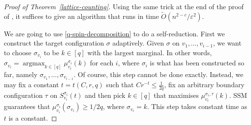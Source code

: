 \documentclass[10pt,a4paper]{article}
\newcommand{\eps}{\varepsilon}
\newcommand{\argmax}{\operatorname{argmax}}
\begin{document}
\begin{proof}[Proof of Theorem~\ref{lattice-counting}]
  Using the same trick at the end of the proof of ,
  it suffices to give an algorithm that runs in time $\widetilde{O}(n^{2-c}/\eps^2)$.

  We are going to use \eqref{q-spin-decomposition} to do a self-reduction.
  First we construct the target configuration $\sigma$ adaptively.
  Given $\sigma$ on $v_1,\ldots,v_{i-1}$,
  we want to choose $\sigma_{v_i}$ to be $k\in [q]$ with the largest marginal.
  In other words, $\sigma_{v_i}=\argmax_{k\in[q]}\mu_{v_i}^{\sigma_i}(k)$ for each $i$,
  where $\sigma_i$ is what has been constructed so far, namely $\sigma_{v_1},\ldots,\sigma_{v_{i-1}}$.
  Of course, this step cannot be done exactly.
  Instead, we may fix a constant $t = t(C,r,q)$ such that $Cr^{-t} \leq \frac{1}{2q}$, fix an arbitrary boundary  configuration $\tau$ on $S^{\sigma_i}_{v_i}(t)$ and then pick $k\in[q]$ that maximises $\mu^{\sigma_i,\tau}_{v_i}(k)$.
  SSM guarantees that
  $\mu_{v_i}^{\sigma_i}(\sigma_{v_i})\ge 1/2q$, where $\sigma_{v_i} = k$.
  This step takes constant time as $t$ is a constant.


\end{proof}
\end{document}
